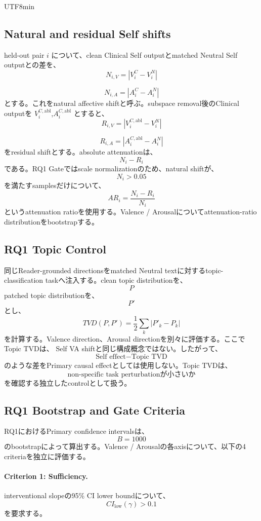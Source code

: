 \documentclass{article} %
\begin{document}
\begin{CJK*}{UTF8}{min}
\subsection{Natural and residual Self shifts}

held-out pair \(i\) について、clean Clinical Self outputとmatched Neutral Self outputとの差を、
\[
N_{i,V}
=
|
V_i^{C}-V_i^{N}
|
\]

\[
N_{i,A}
=
|
A_i^{C}-A_i^{N}
|
\]
とする。これをnatural affective shiftと呼ぶ。subspace removal後のClinical outputを
\(V_i^{C,\mathrm{abl}}\),\(A_i^{C,\mathrm{abl}}\) とすると、
\[
R_{i,V}
=
|
V_i^{C,\mathrm{abl}}
-
V_i^{N}
|
\]

\[
R_{i,A}
=
|
A_i^{C,\mathrm{abl}}
-
A_i^{N}
|
\]
をresidual shiftとする。absolute attenuationは、
\[
N_i-R_i
\]
である。RQ1 Gateではscale normalizationのため、natural shiftが、
\[
N_i>0.05
\]
を満たすsamplesだけについて、
\[
AR_i
=
\frac{
N_i-R_i
}{
N_i
}
\]
というattenuation ratioを使用する。Valence / Arousalについてattenuation-ratio distributionをbootstrapする。


\subsection{RQ1 Topic Control}

同じReader-grounded directionsをmatched Neutral textに対するtopic-classification taskへ注入する。clean topic distributionを、
\[
P
\]
patched topic distributionを、
\[
P'
\]
とし、
\[
TVD(P,P')
=
\frac{1}{2}
\sum_k
|
P'_k-P_k
|
\]
を計算する。Valence direction、Arousal directionを別々に評価する。ここでTopic TVDは、
Self VA shiftと同じ構成概念ではない。したがって、
\[
\text{Self effect}
-
\text{Topic TVD}
\]
のような差をPrimary causal effectとしては使用しない。Topic TVDは、
\[
\text{non-specific task perturbationが小さいか}
\]
を確認する独立したcontrolとして扱う。


\subsection{RQ1 Bootstrap and Gate Criteria}

RQ1におけるPrimary confidence intervalsは、
\[
B=1000
\]
のbootstrapによって算出する。Valence / Arousalの各axisについて、以下の4 criteriaを独立に評価する。

\paragraph{Criterion 1: Sufficiency.}
interventional slopeの95\% CI lower boundについて、
\[
CI_{\mathrm{low}}(\gamma)>0.1
\]
を要求する。



\end{CJK*}
\end{document}
